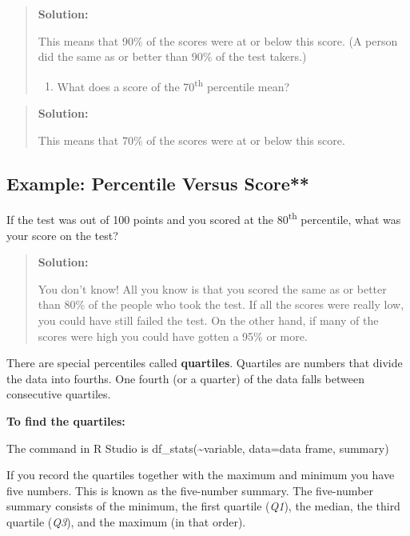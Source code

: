 \documentclass[]{book}
\providecommand{\tightlist}{%
  \setlength{\itemsep}{0pt}\setlength{\parskip}{0pt}}
\begin{document}
\begin{quote}
\textbf{Solution:}

This means that 90\% of the scores were at or below this score. (A person did the same as or better than 90\% of the test takers.)

\begin{enumerate}
\def\labelenumi{\alph{enumi}.}
\setcounter{enumi}{1}
\tightlist
\item
  What does a score of the 70\textsuperscript{th} percentile mean?
\end{enumerate}
\end{quote}

\begin{quote}
\textbf{Solution:}

This means that 70\% of the scores were at or below this score.
\end{quote}

\hypertarget{example-percentile-versus-score}{%
\subsection{Example: Percentile Versus Score**}\label{example-percentile-versus-score}}

If the test was out of 100 points and you scored at the 80\textsuperscript{th} percentile, what was your score on the test?

\begin{quote}
\textbf{Solution:}

You don't know! All you know is that you scored the same as or better than 80\% of the people who took the test. If all the scores were really low, you could have still failed the test. On the other hand, if many of the scores were high you could have gotten a 95\% or more.
\end{quote}

There are special percentiles called \textbf{quartiles}. Quartiles are numbers that divide the data into fourths. One fourth (or a quarter) of the data falls between consecutive quartiles.

\textbf{To find the quartiles:}

The command in R Studio is df\_stats(\textasciitilde{}variable, data=data frame, summary)

If you record the quartiles together with the maximum and minimum you
have five numbers. This is known as the five-number summary. The
five-number summary consists of the minimum, the first quartile (\emph{Q1}),
the median, the third quartile (\emph{Q3}), and the maximum (in that order).
\end{document}
